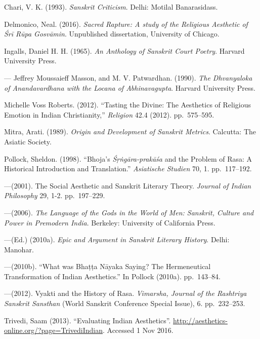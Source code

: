 \begin{thebibliography}{99}
\itemsep=2pt
Chari, V. K. (1993). \textsl{Sanskrit Criticism}. Delhi: Motilal Banarasidass.

Delmonico, Neal. (2016). \textsl{Sacred Rapture: A study of the Religious Aesthetic of Śrī Rūpa Gosvāmin}. Unpublished dissertation, University of Chicago.

Ingalls, Daniel H. H. (1965). \textsl{An Anthology of Sanskrit Court Poetry}. Harvard University Press.

---\kern3pt Jeffrey Moussaieff Masson, and M. V. Patwardhan. (1990). \textsl{The Dhvanyaloka of Anandavardhana with the Locana of Abhinavagupta}. Harvard University Press.



Michelle Voss Roberts. (2012). ``Tasting the Divine: The Aesthetics of Religious Emotion in Indian Christianity,'' \textsl{Religion} 42.4 (2012). pp.~575--595.

Mitra, Arati. (1989). \textsl{Origin and Development of Sanskrit Metrics}. Calcutta: The Asiatic Society.

Pollock, Sheldon. (1998). ``Bhoja's \textsl{Śṛṅgāra-prakāśa} and the Problem of Rasa: A Historical Introduction and Translation.'' \textsl{Asiatische Studien} 70, 1. pp.~117--192. 

---\kern3pt(2001). The Social Aesthetic and Sanskrit Literary Theory. \textsl{Journal of Indian Philosophy} 29, 1-2. pp.~197--229.

---\kern3pt(2006). \textsl{The Language of the Gods in the World of Men: Sanskrit, Culture and Power in Premodern India}. Berkeley: University of California Press.

---\kern3pt(Ed.) (2010a). \textsl{Epic and Argument in Sanskrit Literary History}. Delhi: Manohar.

---\kern3pt(2010b). ``What was Bhaṭṭa Nāyaka Saying? The Hermeneutical Transformation of Indian Aesthetics.'' In Pollock (2010a). pp.~143--84.

---\kern3pt(2012). Vyakti and the History of Rasa. \textsl{Vimarsha, Journal of the Rashtriya Sanskrit Sansthan} (World Sanskrit Conference Special Issue), 6. pp.~232--253.

Trivedi, Saam (2013). ``Evaluating Indian Aesthetics''. \url{http://aesthetics-online.org/?page=TrivediIndian}. Accessed 1 Nov 2016.
\end{thebibliography}

\label{chapter\thechapter:end}
